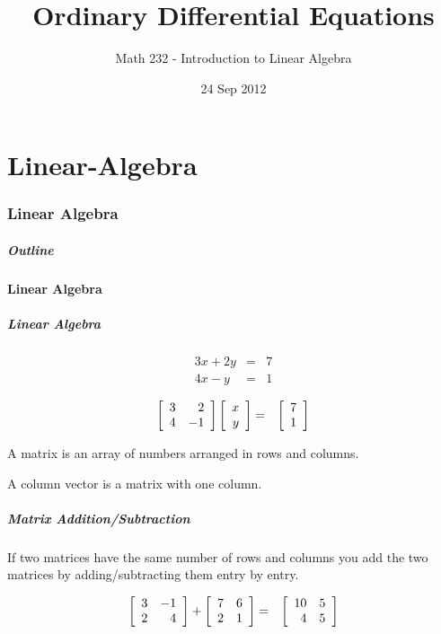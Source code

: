 \part{Linear-Algebra}
\section{Linear Algebra}

\title{Ordinary Differential Equations}
\subtitle{Math 232 - Introduction to Linear Algebra}
\date{24 Sep 2012}

\begin{frame}
  \titlepage
\end{frame}

\begin{frame}
  \frametitle{Outline}
\end{frame}


\subsection{Linear Algebra}


\begin{frame}
  \frametitle{Linear Algebra}


  \begin{eqnarray*}
    3x + 2y & = & 7 \\
    4x - y & = & 1
  \end{eqnarray*}

  {
    \begin{eqnarray*}
      \left[ \begin{array}{rr} 3 & 2 \\ 4 & -1 \end{array} \right] \left[ \begin{array}{r} x \\ y \end{array} \right] & = & \left[ \begin{array}{r} 7 \\ 1 \end{array} \right]
    \end{eqnarray*}

    A matrix is an array of numbers arranged in rows and columns.

    A column vector is a matrix with one column.

  }


\end{frame}


\begin{frame}
  \frametitle{Matrix Addition/Subtraction}

  If two matrices have the same number of rows and columns you add the
  two matrices by adding/subtracting them entry by entry.

  \begin{eqnarray*}
    \left[ \begin{array}{rr} 3 & -1 \\ 2 & 4 \end{array} \right] + \left[ \begin{array}{rr} 7 & 6 \\ 2 & 1 \end{array} \right] & = & \left[ \begin{array}{rr} 10 & 5 \\ 4 & 5 \end{array} \right]
  \end{eqnarray*}

\end{frame}


